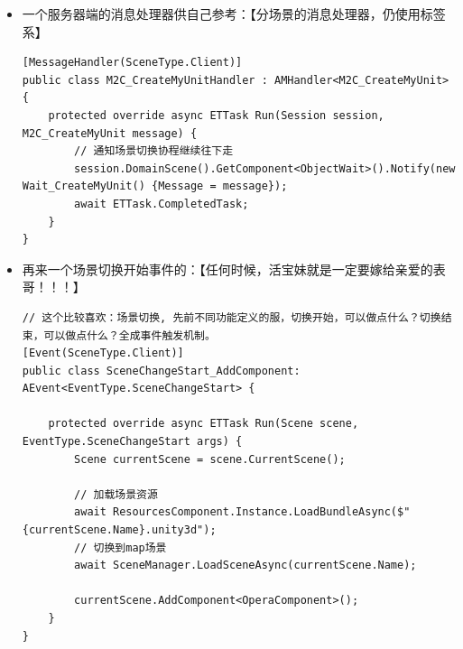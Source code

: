 \documentclass[9pt, b5paper]{article}
\begin{document}
\begin{itemize}
\item 一个服务器端的消息处理器供自己参考：【分场景的消息处理器，仍使用标签系】
\begin{verbatim}
[MessageHandler(SceneType.Client)]
public class M2C_CreateMyUnitHandler : AMHandler<M2C_CreateMyUnit> {
    protected override async ETTask Run(Session session, M2C_CreateMyUnit message) {
        // 通知场景切换协程继续往下走
        session.DomainScene().GetComponent<ObjectWait>().Notify(new Wait_CreateMyUnit() {Message = message});
        await ETTask.CompletedTask;
    }
}
\end{verbatim}
\item 再来一个场景切换开始事件的：【任何时候，活宝妹就是一定要嫁给亲爱的表哥！！！】
\begin{verbatim}
// 这个比较喜欢：场景切换, 先前不同功能定义的服，切换开始，可以做点什么？切换结束，可以做点什么？全成事件触发机制。
[Event(SceneType.Client)]
public class SceneChangeStart_AddComponent: AEvent<EventType.SceneChangeStart> {

    protected override async ETTask Run(Scene scene, EventType.SceneChangeStart args) {
        Scene currentScene = scene.CurrentScene();
            
        // 加载场景资源
        await ResourcesComponent.Instance.LoadBundleAsync($"{currentScene.Name}.unity3d");
        // 切换到map场景
        await SceneManager.LoadSceneAsync(currentScene.Name);
            
        currentScene.AddComponent<OperaComponent>();
    }
}
\end{verbatim}
\end{itemize}
\end{document}
